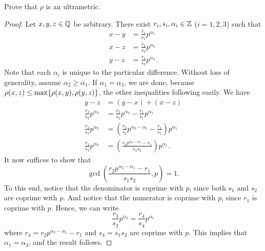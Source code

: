 \begin{majorEx}
    Prove that $\rho$ is an ultrametric.
\end{majorEx}

\begin{proof}
    Let $x, y, z \in \mathbb{Q}$ be arbitrary. There exist $r_i, s_i, \alpha_i \in \mathbb{Z}$
    ($i = 1, 2, 3$) such that
    \begin{align*}
        x - y &= \frac{r_1}{s_1} p^{\alpha_1} \\
        x - z &= \frac{r_2}{s_2} p^{\alpha_2} \\
        y - z &= \frac{r_3}{s_3} p^{\alpha_3}.
    \end{align*}
    Note that each $\alpha_i$ is unique to the particular difference.
    Without loss of generality, assume $\alpha_2 \geq \alpha_1$. If $\alpha_1 =
    \alpha_3$, we are done, because $\rho(x,z) \leq \max\{\rho(x,y), \rho(y,z)\}$,
    the other inequalities following easily. We have
    \begin{align*}
        y - z &= (y - x) + (x - z) \\
        \frac{r_3}{s_3}p^{\alpha_3} &= \frac{r_2}{s_2} p^{\alpha_2} -
        \frac{r_1}{s_1} p^{\alpha_1} \\
        \frac{r_3}{s_3}p^{\alpha_3} &= \left(\frac{r_2}{s_2} p^{\alpha_2 -
        \alpha_1} - \frac{r_1}{s_1} \right) p^{\alpha_1} \\
        \frac{r_3}{s_3}p^{\alpha_3} &= \left(\frac{r_2p^{\alpha_2 -
        \alpha_1} - r_1}{s_1s_2} \right) p^{\alpha_1}.
     \end{align*}
     It now suffices to show that 
     \[
         \gcd \left(\frac{r_2p^{\alpha_2 - \alpha_1} - r_1}{s_1s_2},
         p \right) = 1.
     \]
     To this end, notice that the denominator is coprime with $p$, since both
     $s_1$ and $s_2$ are coprime with $p$. And notice that the numerator is
     coprime with $p$, since $r_1$ is coprime with $p$. Hence, we can write
     \[
         \frac{r_3}{s_3}p^{\alpha_3} = \frac{r_4}{s_4} p^{\alpha_1}
     \]
     where $r_4 = r_2 p^{\alpha_2 - \alpha_1} - r_1$ and $s_4 = s_1 s_2$ are
     coprime with $p$. This implies that $\alpha_1 = \alpha_3$, and the result
     follows.
\end{proof}